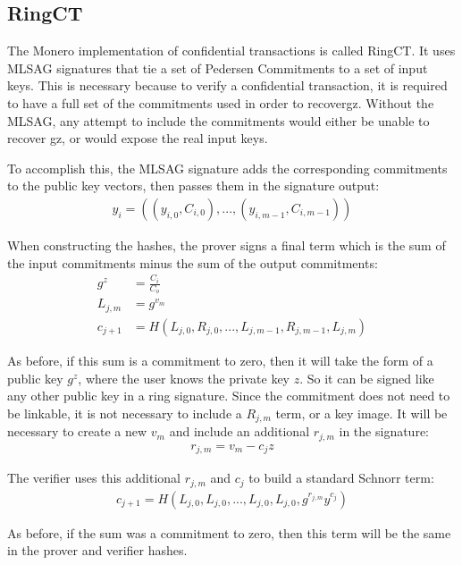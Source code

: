 \documentclass{article}
\begin{document}
\subsection{RingCT}

The Monero implementation of confidential transactions is called RingCT.  It uses MLSAG signatures that tie a set of Pedersen Commitments to a set of input keys.  This is necessary because to verify a confidential transaction, it is required to have a full set of the commitments used in order to recovergz.  Without the MLSAG, any attempt to include the commitments would either be unable to recover gz, or would expose the real input keys.

To accomplish this, the MLSAG signature adds the corresponding commitments to the public key vectors, then passes them in the signature output:
\begin{align}
  y_i = ((y_{i,0}, C_{i,0}), ..., (y_{i,m-1}, C_{i,m-1}))
\end{align}

When constructing the hashes, the prover signs a final term which is the sum of the input commitments minus the sum of the output commitments:
\begin{align}
  g^z &= \frac{C_i}{C_o}\\
  L_{j,m} &= g^{v_m}\\
  c_{j+1} &= H(L_{j,0}, R_{j,0}, ... , L_{j,m-1}, R_{j, m-1}, L_{j,m})
\end{align}

As before, if this sum is a commitment to zero, then it will take the form of a public key $g^z$, where the user knows the private key $z$.  So it can be signed like any other public key in a ring signature.  Since the commitment does not need to be linkable, it is not necessary to include a $R_{j,m}$ term, or a key image.  It will be necessary to create a new $v_m$ and include an additional $r_{j,m}$ in the signature:
\begin{align}
  r_{j,m} = v_m - c_j z
\end{align}

The verifier uses this additional $r_{j,m}$ and $c_j$ to build a standard Schnorr term:
\begin{align}
  c_{j+1} = H(L_{j,0}, L_{j,0}, ... , L_{j,0}, L_{j,0}, g^{r_{j,m}} y^{c_j})
\end{align}

As before, if the sum was a commitment to zero, then this term will be the same in the prover and verifier hashes.
\end{document}
